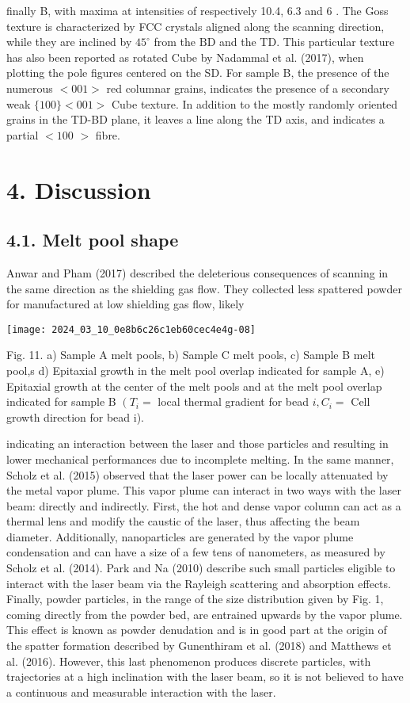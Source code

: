 \documentclass[10pt]{article}
\begin{document}
finally B, with maxima at intensities of respectively 10.4, 6.3 and 6 . The Goss texture is characterized by FCC crystals aligned along the scanning direction, while they are inclined by $45^{\circ}$ from the $\mathrm{BD}$ and the TD. This particular texture has also been reported as rotated Cube by Nadammal et al. (2017), when plotting the pole figures centered on the SD. For sample B, the presence of the numerous $<001>$ red columnar grains, indicates the presence of a secondary weak $\{100\}<001>$ Cube texture. In addition to the mostly randomly oriented grains in the TD-BD plane, it leaves a line along the TD axis, and indicates a partial $<100$ $>$ fibre.

\section*{4. Discussion}
\subsection*{4.1. Melt pool shape}
Anwar and Pham (2017) described the deleterious consequences of scanning in the same direction as the shielding gas flow. They collected less spattered powder for manufactured at low shielding gas flow, likely

\begin{center}
\texttt{[image: 2024\_03\_10\_0e8b6c26c1eb60cec4e4g-08]}
\end{center}

Fig. 11. a) Sample A melt pools, b) Sample C melt pools, c) Sample B melt pool,s d) Epitaxial growth in the melt pool overlap indicated for sample A, e) Epitaxial growth at the center of the melt pools and at the melt pool overlap indicated for sample B $\left(T_{i}=\right.$ local thermal gradient for bead $i, C_{i}=$ Cell growth direction for bead i).

indicating an interaction between the laser and those particles and resulting in lower mechanical performances due to incomplete melting. In the same manner, Scholz et al. (2015) observed that the laser power can be locally attenuated by the metal vapor plume. This vapor plume can interact in two ways with the laser beam: directly and indirectly. First, the hot and dense vapor column can act as a thermal lens and modify the caustic of the laser, thus affecting the beam diameter. Additionally, nanoparticles are generated by the vapor plume condensation and can have a size of a few tens of nanometers, as measured by Scholz et al. (2014). Park and Na (2010) describe such small particles eligible to interact with the laser beam via the Rayleigh scattering and absorption effects. Finally, powder particles, in the range of the size distribution given by Fig. 1, coming directly from the powder bed, are entrained upwards by the vapor plume. This effect is known as powder denudation and is in good part at the origin of the spatter formation described by Gunenthiram et al. (2018) and Matthews et al. (2016). However, this last phenomenon produces discrete particles, with trajectories at a high inclination with the laser beam, so it is not believed to have a continuous and measurable interaction with the laser.
\end{document}
